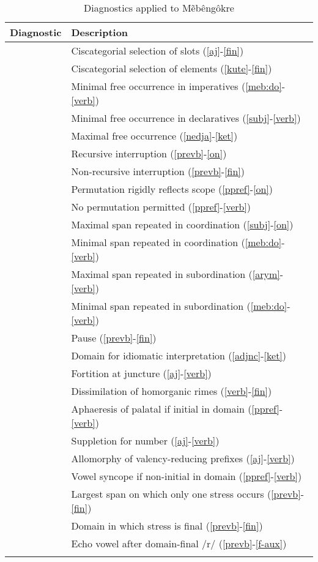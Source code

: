 \documentclass[output=paper]{langscibook}
\begin{document}
\begin{table}[t]
\caption{Diagnostics applied to Mẽbêngôkre}
\label{tab:diagnostics}
\begin{tabular}{>{\rownumberd}ll} \lsptoprule \gdef\rownumberd{\refstepcounter{diagnostics}[\thediagnostics]}
	Diagnostic      & Description \\ \midrule
\label{ciscat}&Ciscategorial selection of slots (\ref{aj}-\ref{fin})\\
\label{ciscate}&Ciscategorial selection of elements (\ref{kute}-\ref{fin})\\
\label{minfrimp}&Minimal free occurrence in imperatives (\ref{meb:do}-\ref{verb}) \\
\label{minfrdec}&Minimal free occurrence in declaratives (\ref{subj}-\ref{verb})\\
\label{maxfr}&Maximal free occurrence (\ref{nedja}-\ref{ket})\\
\label{recint}&Recursive interruption (\ref{prevb}-\ref{on})\\
\label{nrecint}&Non-recursive interruption (\ref{prevb}-\ref{fin})\\
\label{scopeperm}&Permutation rigidly reflects scope (\ref{ppref}-\ref{on})\\
\label{noperm}&No permutation permitted (\ref{ppref}-\ref{verb})\\
\label{maxcoord}&Maximal span repeated in coordination (\ref{subj}-\ref{on}) \\
\label{mincoord}&Minimal span repeated in coordination (\ref{meb:do}-\ref{verb}) \\
\label{maxsubord}&Maximal span repeated in subordination (\ref{arym}-\ref{verb})\\
\label{minsubord}&Minimal span repeated in subordination (\ref{meb:do}-\ref{verb}) \\ %
\label{pause}&Pause (\ref{prevb}-\ref{fin})\\
\label{idioms}&Domain for idiomatic interpretation (\ref{adjnc}-\ref{ket})\\
\label{fortition}&Fortition at juncture (\ref{aj}-\ref{verb})\\
\label{dissimilation}&Dissimilation of homorganic rimes (\ref{verb}-\ref{fin})\\
\label{aphaeresis}&Aphaeresis of palatal if initial in domain (\ref{ppref}-\ref{verb})\\
\label{suppletion}&Suppletion for number (\ref{aj}-\ref{verb})\\
\label{ajbi}&Allomorphy of valency-reducing prefixes (\ref{aj}-\ref{verb})\\
\label{syncope}&Vowel syncope if non-initial in domain (\ref{ppref}-\ref{verb})\\
\label{onestress}&Largest span on which only one stress occurs (\ref{prevb}-\ref{fin})\\
\label{stressfinal}&Domain in which stress is final (\ref{prevb}-\ref{fin})\\
\label{echovowel}&Echo vowel after domain-final /r/ (\ref{prevb}-\ref{f-aux})\\
\lspbottomrule
\end{tabular}
\end{table}
\end{document}
